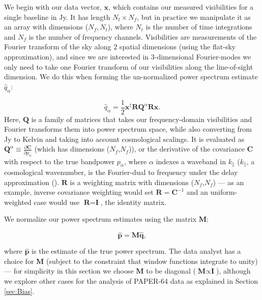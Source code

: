 \documentclass[preprint2,numberedappendix,tighten]{aastex6}  %
\begin{document}
We begin with our data vector, $\textbf{x}$, which contains our measured visibilities for a single baseline in Jy. It has length $N_{t} \times N_{f}$, but in practice we manipulate it as an array with dimensions ($N_{f}, N_{t}$), where 
$N_{t}$ is the number of time integrations and $N_{f}$ is the number of frequency channels. Visibilities are measurements of 
the Fourier transform of the sky along $2$ spatial dimensions (using the flat-sky approximation), and since we are interested in $3$-dimensional Fourier-modes 
we only need to take one Fourier transform of our visibilities along the line-of-sight dimension. We do this when forming the un-normalized power spectrum estimate $\widehat{q}_{\alpha}$:

\begin{equation}
\label{eq:qhat}
\widehat{q}_{\alpha} = \frac{1}{2}\textbf{x}^{\dagger}\textbf{R}\textbf{Q}^{\alpha}\textbf{R}\textbf{x}.
\end{equation}
Here, \noindent $\textbf{Q}$ is a family of matrices that takes our frequency-domain visibilities and Fourier transforms them into 
power spectrum space, while also converting from Jy to 
Kelvin and taking into account cosmological scalings. It is evaluated as $\textbf{Q}^{\alpha} \equiv \frac{\partial\textbf{C}}{\partial p_{\alpha}}$ (which has dimensions ($N_{f}$,$N_{f}$)), or the derivative of the covariance $\textbf{C}$ with respect to the true bandpower $p_\alpha$, where $\alpha$ indexes a waveband in $k_{\parallel}$ ($k_{\parallel}$, a cosmological wavenumber, is the 
Fourier-dual to frequency under the delay approximation (\citealt{parsons_et_al2012b}). $\textbf{R}$ is a weighting matrix with dimensions ($N_{f}$,$N_{f}$) --- as 
an example, inverse covariance weighting would set $\textbf{R} = \textbf{C}^{-1}$ and an uniform-weighted case would use $
\textbf{R} = \textbf{I}$, the identity matrix.

We normalize our power spectrum estimates using the matrix $\textbf{M}$:

\begin{equation}
\label{eq:phat}
\widehat{\textbf{p}} = \textbf{M}\widehat{\textbf{q}},
\end{equation}

\noindent where $\widehat{\textbf{p}}$ is the estimate of the true power spectrum. The data analyst has a choice for $
\textbf{M}$ (subject to the constraint that window functions integrate to unity) --- for simplicity in this section we choose $\textbf{M}$ to be diagonal ($\textbf{M} \propto \textbf{I}$), although we explore other cases for the analysis 
of PAPER-64 data as explained in Section \ref{sec:Bias}.
\end{document}
